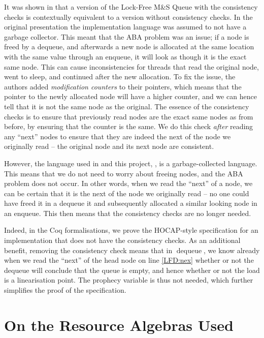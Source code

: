 \documentclass[a4paper, 10pt]{report}
\theoremstyle{definition}
\newcommand{\dequeue}{\operatorname{dequeue}}
\newcommand{\msq}{M\&S Queue}
\newcommand{\lfmsq}{Lock-Free \msq{}}
\begin{document}
It was shown in \citet{DBLP:conf/cpp/VindumB21} that a version of the \lfmsq{} with the consistency checks is contextually equivalent to a version without consistency checks. In the original presentation \citep{DBLP:conf/podc/MichaelS96} the implementation language was assumed to not have a garbage collector. This meant that the ABA problem was an issue; if a node is freed by a dequeue, and afterwards a new node is allocated at the same location with the same value through an enqueue, it will look as though it is the exact same node. This can cause inconsistencies for threads that read the original node, went to sleep, and continued after the new allocation.
To fix the issue, the authors added \textit{modification counters} to their pointers, which means that the pointer to the newly allocated node will have a higher counter, and we can hence tell that it is not the same node as the original. The essence of the consistency checks is to ensure that previously read nodes are the exact same nodes as from before, by ensuring that the counter is the same.
We do this check \textit{after} reading any ``next'' nodes to ensure that they are indeed the next of the node we originally read -- the original node and its next node are consistent.

However, the language used in \citet{DBLP:conf/cpp/VindumB21} and this project, \heaplang, is a garbage-collected language. This means that we do not need to worry about freeing nodes, and the ABA problem does not occur. In other words, when we read the ``next'' of a node, we can be certain that it is the next of the node we originally read -- no one could have freed it in a dequeue it and subsequently allocated a similar looking node in an enqueue. This then means that the consistency checks are no longer needed.

Indeed, in the Coq formalisations, we prove the HOCAP-style specification for an implementation that does not have the consistency checks. As an additional benefit, removing the consistency check means that in $\dequeue$, we know already when we read the ``next'' of the head node on line \ref{LFD:nex} whether or not the dequeue will conclude that the queue is empty, and hence whether or not the load is a linearisation point. The prophecy variable is thus not needed, which further simplifies the proof of the specification.


\chapter{On the Resource Algebras Used}
\label{ch:RA}
\end{document}

